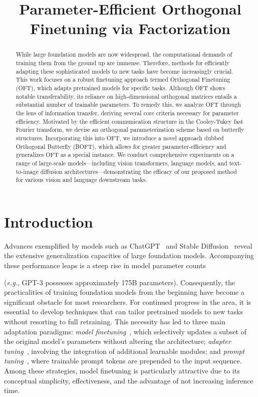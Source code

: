 \title{Parameter-Efficient Orthogonal Finetuning via Factorization}

\begin{abstract}
While large foundation models are now widespread, the computational demands of training them from the ground up are immense. Therefore, methods for efficiently adapting these sophisticated models to new tasks have become increasingly crucial. This work focuses on a robust finetuning approach termed Orthogonal Finetuning (OFT), which adapts pretrained models for specific tasks. Although OFT shows notable transferability, its reliance on high-dimensional orthogonal matrices entails a substantial number of trainable parameters. To remedy this, we analyze OFT through the lens of information transfer, deriving several core criteria necessary for parameter efficiency. Motivated by the efficient communication structure in the Cooley-Tukey fast Fourier transform, we devise an orthogonal parameterization scheme based on butterfly structures. Incorporating this into OFT, we introduce a novel approach dubbed Orthogonal Butterfly (BOFT), which allows for greater parameter-efficiency and generalizes OFT as a special instance. We conduct comprehensive experiments on a range of large-scale models—including vision transformers, language models, and text-to-image diffusion architectures—demonstrating the efficacy of our proposed method for various vision and language downstream tasks.
\end{abstract}

\section{Introduction}

Advances exemplified by models such as ChatGPT~\cite{brown2020language,chen2021evaluating} and Stable Diffusion~\cite{rombach2022high} reveal the extensive generalization capacities of large foundation models. Accompanying these performance leaps is a steep rise in model parameter counts 

(\emph{e.g.}, GPT-3 possesses approximately 175B parameters). Consequently, the practicalities of training foundation models from the beginning have become a significant obstacle for most researchers. For continued progress in the area, it is essential to develop techniques that can tailor pretrained models to new tasks without resorting to full retraining. This necessity has led to three main adaptation paradigms: \emph{model finetuning}~\cite{hulora2022,zaken2022bitfit,guo2020parameter,raffel2020exploring,qiu2023controlling,zhang2022adaptive,chavan2023one}, which selectively updates a subset of the original model's parameters without altering the architecture; \emph{adapter tuning}~\cite{rebuffi2017learning,houlsby2019parameter,pfeiffer2020adapterfusion,lin2020exploring,he2021towards}, involving the integration of additional learnable modules; and \emph{prompt tuning}~\cite{li2021prefix,lester2021power}, where trainable prompt tokens are prepended to the input sequence. Among these strategies, model finetuning is particularly attractive due to its conceptual simplicity, effectiveness, and the advantage of not increasing inference time.


